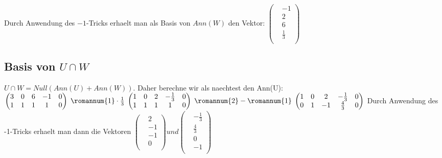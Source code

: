 \documentclass{article}
\begin{document}
Durch Anwendung des $-1$-Tricks erhaelt man als Basis von $Ann(W)$ den Vektor:
\begin{math}
  \begin{pmatrix}
    & -1 \\
    & 2 \\
    & 6 \\
    &  \frac{1}{3} \\
  \end{pmatrix}
  \end{math}
  
\subsection{Basis von $ U \cap W$}
$ U \cap W = Null(Ann(U) + Ann(W)) $. Daher berechne wir als naechtest den Ann(U):
\newline
\newline
\newline
\begin{math}
  \begin{pmatrix}
    3 & 0 & 6 & -1 & 0 \\
    1 & 1 & 1 & 1 & 0 \\
  \end{pmatrix}
  \;
    \begin{matrix}
      \romannum{1} \cdot \frac{1}{3} \\
    \end{matrix}
    \;
    \begin{pmatrix}
      1 & 0 & 2 & - \frac{1}{3} & 0 \\
      1 & 1 & 1 & 1 & 0 \\
      \end{pmatrix}
      \;
      \begin{matrix}
        \romannum{2} - \romannum{1} \\
      \end{matrix}
      \;
      \begin{pmatrix}
      1 & 0 & 2 & - \frac{1}{3} & 0 \\
        0 & 1 & -1 & \frac{4}{3} & 0 \\
        \end{pmatrix}
      \end{math}
      \newline
      Durch Anwendung des -1-Tricks erhaelt man dann die Vektoren
      \begin{math}
        \begin{pmatrix}
          & 2 \\
          & -1 \\
          & -1 \\
          & 0 \\
        \end{pmatrix}
        und
        \begin{pmatrix}
          & - \frac{1}{3} \\
          &  \frac{4}{3} \\
          & 0 \\
          & -1 \\
          \end{pmatrix}
        \end{math}
\end{document}
